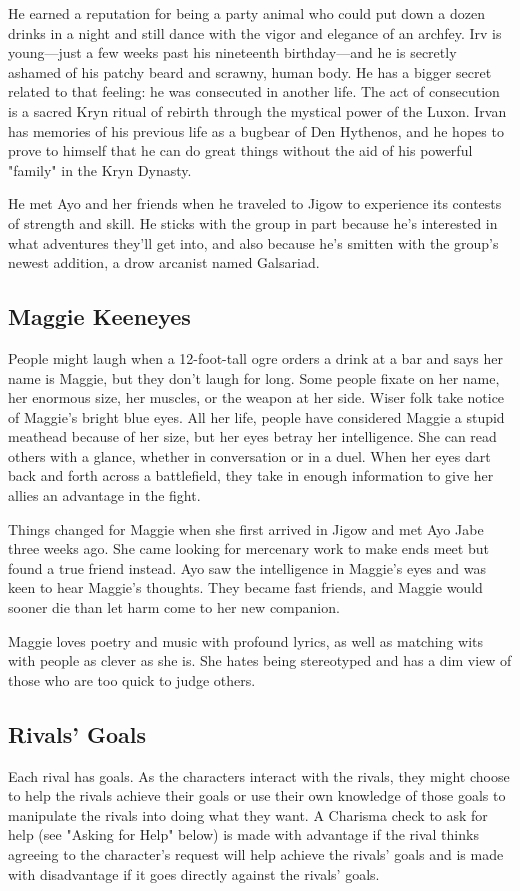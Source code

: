 \documentclass[10pt,a4paper,twoside,fancy,bg=print,twocolumn,openany,nodeprecatedcode]{dndbook}
\begin{document}
He earned a reputation for being a party animal who could put down a dozen drinks in a night and still dance with the vigor and elegance of an archfey. Irv is young—just a few weeks past his nineteenth birthday—and he is secretly ashamed of his patchy beard and scrawny, human body. He has a bigger secret related to that feeling: he was consecuted in another life. The act of consecution is a sacred Kryn ritual of rebirth through the mystical power of the Luxon. Irvan has memories of his previous life as a bugbear of Den Hythenos, and he hopes to prove to himself that he can do great things without the aid of his powerful "family" in the Kryn Dynasty.

He met Ayo and her friends when he traveled to Jigow to experience its contests of strength and skill. He sticks with the group in part because he's interested in what adventures they'll get into, and also because he's smitten with the group's newest addition, a drow arcanist named Galsariad.

\subsection{Maggie Keeneyes}
People might laugh when a 12-foot-tall ogre orders a drink at a bar and says her name is Maggie, but they don't laugh for long. Some people fixate on her name, her enormous size, her muscles, or the weapon at her side. Wiser folk take notice of Maggie's bright blue eyes. All her life, people have considered Maggie a stupid meathead because of her size, but her eyes betray her intelligence. She can read others with a glance, whether in conversation or in a duel. When her eyes dart back and forth across a battlefield, they take in enough information to give her allies an advantage in the fight.

Things changed for Maggie when she first arrived in Jigow and met Ayo Jabe three weeks ago. She came looking for mercenary work to make ends meet but found a true friend instead. Ayo saw the intelligence in Maggie's eyes and was keen to hear Maggie's thoughts. They became fast friends, and Maggie would sooner die than let harm come to her new companion.

Maggie loves poetry and music with profound lyrics, as well as matching wits with people as clever as she is. She hates being stereotyped and has a dim view of those who are too quick to judge others.

\subsection{Rivals' Goals}
Each rival has goals. As the characters interact with the rivals, they might choose to help the rivals achieve their goals or use their own knowledge of those goals to manipulate the rivals into doing what they want. A Charisma check to ask for help (see "Asking for Help" below) is made with advantage if the rival thinks agreeing to the character's request will help achieve the rivals' goals and is made with disadvantage if it goes directly against the rivals' goals.
\end{document}
